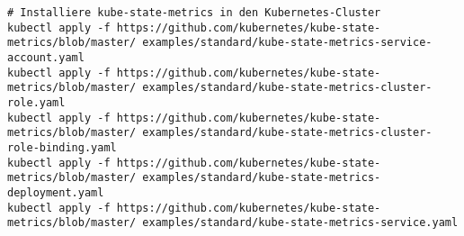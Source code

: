 \begin{verbatim}
# Installiere kube-state-metrics in den Kubernetes-Cluster
kubectl apply -f https://github.com/kubernetes/kube-state-metrics/blob/master/ examples/standard/kube-state-metrics-service-account.yaml
kubectl apply -f https://github.com/kubernetes/kube-state-metrics/blob/master/ examples/standard/kube-state-metrics-cluster-role.yaml
kubectl apply -f https://github.com/kubernetes/kube-state-metrics/blob/master/ examples/standard/kube-state-metrics-cluster-role-binding.yaml
kubectl apply -f https://github.com/kubernetes/kube-state-metrics/blob/master/ examples/standard/kube-state-metrics-deployment.yaml
kubectl apply -f https://github.com/kubernetes/kube-state-metrics/blob/master/ examples/standard/kube-state-metrics-service.yaml
\end{verbatim}